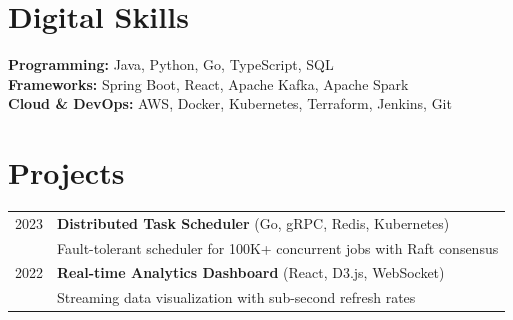 \documentclass[10pt,a4paper]{article}
\begin{document}
\section{Digital Skills}

\textbf{Programming:} Java, Python, Go, TypeScript, SQL\\[2pt]
\textbf{Frameworks:} Spring Boot, React, Apache Kafka, Apache Spark\\[2pt]
\textbf{Cloud \& DevOps:} AWS, Docker, Kubernetes, Terraform, Jenkins, Git

\section{Projects}

\noindent\begin{tabularx}{\textwidth}{@{}p{2.2cm}|X@{}}
2023 & \textbf{Distributed Task Scheduler} (Go, gRPC, Redis, Kubernetes)\\
& Fault-tolerant scheduler for 100K+ concurrent jobs with Raft consensus\\[4pt]
2022 & \textbf{Real-time Analytics Dashboard} (React, D3.js, WebSocket)\\
& Streaming data visualization with sub-second refresh rates
\end{tabularx}
\end{document}
